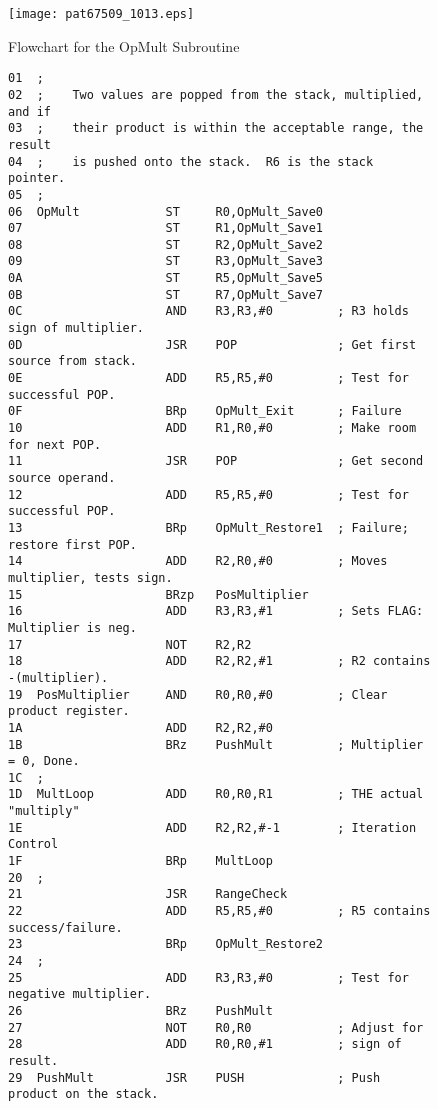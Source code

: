 \documentclass{patt}
\begin{document}
\begin{figure}
\centerline{\texttt{[image: pat67509\_1013.eps]}}
\caption{Flowchart for the OpMult Subroutine}
\label{fig:mul.flowchart}
\end{figure}

\begin{figure}
\begin{Verbatim}[fontsize=\fontsize{9}{11}\selectfont]
01  ;
02  ;    Two values are popped from the stack, multiplied, and if 
03  ;    their product is within the acceptable range, the result 
04  ;    is pushed onto the stack.  R6 is the stack pointer.
05  ;
06  OpMult            ST     R0,OpMult_Save0
07                    ST     R1,OpMult_Save1
08                    ST     R2,OpMult_Save2
09                    ST     R3,OpMult_Save3
0A                    ST     R5,OpMult_Save5
0B                    ST     R7,OpMult_Save7
0C                    AND    R3,R3,#0         ; R3 holds sign of multiplier.
0D                    JSR    POP              ; Get first source from stack.
0E                    ADD    R5,R5,#0         ; Test for successful POP.
0F                    BRp    OpMult_Exit      ; Failure
10                    ADD    R1,R0,#0         ; Make room for next POP.
11                    JSR    POP              ; Get second source operand.
12                    ADD    R5,R5,#0         ; Test for successful POP.
13                    BRp    OpMult_Restore1  ; Failure; restore first POP.
14                    ADD    R2,R0,#0         ; Moves multiplier, tests sign.
15                    BRzp   PosMultiplier
16                    ADD    R3,R3,#1         ; Sets FLAG: Multiplier is neg.
17                    NOT    R2,R2
18                    ADD    R2,R2,#1         ; R2 contains -(multiplier).
19  PosMultiplier     AND    R0,R0,#0         ; Clear product register.
1A                    ADD    R2,R2,#0
1B                    BRz    PushMult         ; Multiplier = 0, Done.
1C  ;
1D  MultLoop          ADD    R0,R0,R1         ; THE actual "multiply"
1E                    ADD    R2,R2,#-1        ; Iteration Control
1F                    BRp    MultLoop
20  ;
21                    JSR    RangeCheck
22                    ADD    R5,R5,#0         ; R5 contains success/failure.
23                    BRp    OpMult_Restore2
24  ;
25                    ADD    R3,R3,#0         ; Test for negative multiplier.
26                    BRz    PushMult
27                    NOT    R0,R0            ; Adjust for
28                    ADD    R0,R0,#1         ; sign of result.
29  PushMult          JSR    PUSH             ; Push product on the stack.

\end{Verbatim}
\end{figure}
\end{document}
